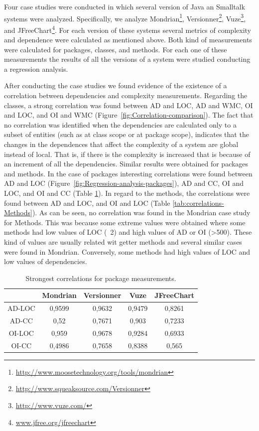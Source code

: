 \documentclass{sig-alternate}
\newcommand{\figref}[1]{Figure~\ref{fig:#1}}
\begin{document}
Four case studies were conducted in which several version of Java an Smalltalk systems were analyzed. Specifically, we analyze Mondrian\footnote{\url{http://www.moosetechnology.org/tools/mondrian}}, Versionner\footnote{\url{http://www.squeaksource.com/Versionner}}, Vuze\footnote{\url{http://www.vuze.com/}}, and JFreeChart\footnote{\url{www.jfree.org/jfreechart}}. For each version of these systems several metrics of complexity and dependence were calculated as mentioned above. Both kind of measurements were calculated for packages, classes, and methods. For each one of these measurements the results of all the versions of a system were studied conducting a regression analysis.

After conducting the case studies we found evidence of the existence of a correlation between dependencies and complexity measurements.
Regarding the classes, a strong correlation was found between AD and LOC, AD and WMC, OI and LOC, and OI and WMC (\figref{Correlation-comparison}). The fact that no correlation was identified when the dependencies are calculated only to a subset of entities (such as at class scope or at package scope), indicates that the changes in the dependences that affect the complexity of a system are global instead of local. That is, if there is the complexity is increased that is because of an increment of all the dependencies.
Similar results were obtained for packages and methods. In the case of packages interesting correlations were found between AD and LOC (\figref{Regression-analysis-packages}), AD and CC, OI and LOC, and OI and CC (Table \ref{tab:correlations-Packages}). In regard to the methods, the correlations were found between AD and LOC, and OI and LOC (Table \ref{tab:correlations-Methods}). As can be seen, no correlation was found in the Mondrian case study for Methods. This was because some extreme values were obtained where some methods had low values ​​of LOC (~2) and high values of AD or OI (>500). These kind of values are usually related wit getter methods and several similar cases were found in Mondrian. Conversely, some methods had high values of LOC and low values of dependencies. 



\begin{table}
\begin{centering}
\begin{tabular}{|c|c|c|c|c|}
\hline 
 & Mondrian & Versionner & Vuze & JFreeChart\tabularnewline
\hline 
\hline 
AD-LOC & 0,9599 & 0,9632 & 0,9479 & 0,8261\tabularnewline
\hline 
AD-CC & 0,52 & 0,7671 & 0,903 & 0,7233\tabularnewline
\hline 
OI-LOC & 0,959 & 0,9678 & 0,9284 & 0,6933\tabularnewline
\hline 
OI-CC & 0,4986 & 0,7658 & 0,8388 & 0,565\tabularnewline
\hline 
\end{tabular}
\par\end{centering}

\caption{Strongest correlations for package measurements.\label{tab:correlations-Packages}}
\end{table}
\end{document}
